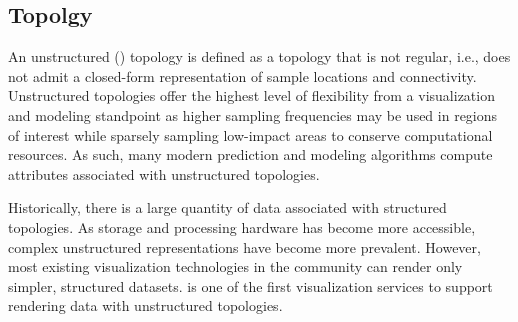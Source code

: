 \subsection{\ugrid{} Topolgy}
An unstructured (\ugrid{}) topology is defined as a topology that is
not regular, i.e., does not admit a closed-form representation of
sample locations and connectivity. Unstructured topologies offer the
highest level of flexibility from a visualization and modeling
standpoint as higher sampling frequencies may be used in regions of
interest while sparsely sampling low-impact areas to conserve
computational resources. As such, many modern \cf{} prediction and
modeling algorithms compute attributes associated with unstructured
topologies.

Historically, there is a large quantity of \cf{} data associated with
structured topologies. As storage and processing hardware has become
more accessible, complex unstructured representations have become more
prevalent. However, most existing visualization technologies in the
\cf{} community can render only simpler, structured
datasets. \sciwms{} is one of the first visualization services to
support rendering data with unstructured topologies.

